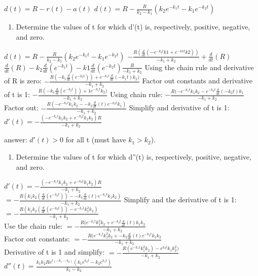 \documentclass[]{article}
\providecommand{\tightlist}{%
  \setlength{\itemsep}{0pt}\setlength{\parskip}{0pt}}
\begin{document}
\(d(t) = R - r(t) - a(t)\)
\(d(t) = R - \frac{R}{k_2 - k_1}(k_2 e ^{-k_1 t} - k_1 e^{-k_2 t})\)

\begin{enumerate}
\def\labelenumi{(\alph{enumi})}
\tightlist
\item
  Determine the values of t for which d'(t) is, respectively, positive,
  negative, and zero.
\end{enumerate}

\(d(t) = R - \frac{R}{k_2 - k_1}(k_2 e ^{-k_1 t} - k_1 e^{-k_2 t})\)
\(- \frac{R (\frac{d}{dt} (-e^{-k_2 t} k1 + e^{-k1t}k2))}{-k_1 + k_2} + \frac{d}{dt} (R)\)\\
\(\frac{d}{dt}(R) - k_2 \frac{d}{dt}(e^{-k_1 t})-k1\frac{d}{dt}(e^{-k_2 t})\frac{R}{-k_1 + k_2}\)
Using the chain rule and derivative of R is zero:
\(- \frac{R(-k_1 \frac{d}{dt}(e^{-k_2 t})) + e^{-k_1 t}\frac{d}{dt}(-k_1 t)k_2)}{-k_1 + k_2}\)
Factor out constants and derivative of t is 1:
\(- \frac{R(-k_1 \frac{d}{dt}(e^{-k_2 t})) + 1e^{-k_1 t}k_2)}{-k_1 + k_2}\)
Using chain rule:
\(- \frac{R(-e^{-k_1 t}k_1 k_2 - e^{-k_2 t} \frac{d}{dt} (-k_2 t)k_1}{-k_1 + k_2}\)
Factor out:
\(- \frac{R(-e^{-k_1 t}k_1 k_2 - -k_2 \frac{d}{dt}(t)e^{-k_2 t}k_1)}{-k_1 + k_2}\)
Simplify and derivative of t is 1:
\(d'(t) = -\frac{(-e^{-k_1 t}k_1 k_2 + e^{-k_2 t}k_1 k_2)R}{-k_1 + k_2}\)

answer: \(d'(t) > 0\) for all t (must have \(k_1 > k_2\)).

\begin{enumerate}
\def\labelenumi{(\alph{enumi})}
\setcounter{enumi}{1}
\tightlist
\item
  Determine the values of t for which d''(t) is, respectively, positive,
  negative, and zero.
\end{enumerate}

\(d'(t) = -\frac{(-e^{-k_1 t}k_1 k_2 + e^{-k_2 t}k_1 k_2)R}{-k_1 + k_2}\)\\
\(= -\frac{R(k_1 k_2 (\frac{d}{dt}(e^{-k_2 t})) - -k_1 \frac{d}{dt}(t)e^{-k_1 t}k_1 k_2 )}{-k_1 + k_2}\)
Simplify and the derivative of t is 1:
\(= -\frac{R(k_1 k_2 (\frac{d}{dt}(e^{-k_2 t})) - e^{-k_1 t}k_1^2 k_2 )}{-k_1 + k_2}\)\\
Use the chain rule:
\(= -\frac{R(e^{-k_1 t}k_1^2 k_2 + e^{-k_2 t} \frac{d}{dt}(t)k_1 k_2 }{-k_1 + k_2}\)\\
Factor out constants:
\(= -\frac{R(e^{-k_1 t}k_1^2 k_2 + - k_2 \frac{d}{dt}(t) e^{-k_2 t}k_1 k_2} {-k_1 + k_2}\)\\
Derivative of t is 1 and simplify:
\(= - \frac{R (e^{-k_1 t}k_1^2 k_2) - e^{k_2 t} k_1 k_2^2)}{-k_1 + k_2}\)\\
\(d''(t) = \frac{k_1 k_2 R e^{t(-k_1-k_2)}(k_1 e^{k_2 t}-k_2 e^{k_1 t})}{k_1 - k_2}\)
\end{document}
